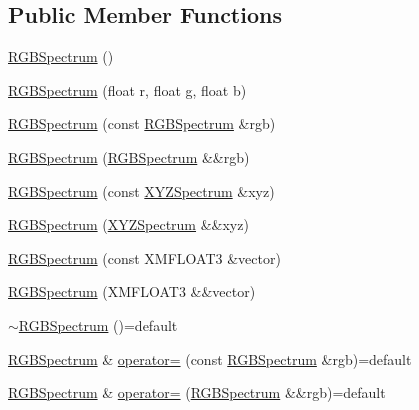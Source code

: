 \subsection*{Public Member Functions}
\begin{DoxyCompactItemize}
\item 
\hyperlink{structmage_1_1_r_g_b_spectrum_ac9ebcf270e9572fd0af180f50b7ceb10}{R\+G\+B\+Spectrum} ()
\item 
\hyperlink{structmage_1_1_r_g_b_spectrum_aae798159a0ea02e95347918ef881b3aa}{R\+G\+B\+Spectrum} (float r, float g, float b)
\item 
\hyperlink{structmage_1_1_r_g_b_spectrum_a5cf405a5fbaa641a421df5767d2847b4}{R\+G\+B\+Spectrum} (const \hyperlink{structmage_1_1_r_g_b_spectrum}{R\+G\+B\+Spectrum} \&rgb)
\item 
\hyperlink{structmage_1_1_r_g_b_spectrum_a866ef0a3fe393f853d969e00a4c02086}{R\+G\+B\+Spectrum} (\hyperlink{structmage_1_1_r_g_b_spectrum}{R\+G\+B\+Spectrum} \&\&rgb)
\item 
\hyperlink{structmage_1_1_r_g_b_spectrum_a7c87ee10a81c55b1954915c1abea0cb9}{R\+G\+B\+Spectrum} (const \hyperlink{structmage_1_1_x_y_z_spectrum}{X\+Y\+Z\+Spectrum} \&xyz)
\item 
\hyperlink{structmage_1_1_r_g_b_spectrum_ad3307598d8156374483f66c0d3492b90}{R\+G\+B\+Spectrum} (\hyperlink{structmage_1_1_x_y_z_spectrum}{X\+Y\+Z\+Spectrum} \&\&xyz)
\item 
\hyperlink{structmage_1_1_r_g_b_spectrum_af2837c778d5aa9b065f5b8b0a039fa02}{R\+G\+B\+Spectrum} (const X\+M\+F\+L\+O\+A\+T3 \&vector)
\item 
\hyperlink{structmage_1_1_r_g_b_spectrum_aa97e6d34ba6bd45c071b458ee7f69191}{R\+G\+B\+Spectrum} (X\+M\+F\+L\+O\+A\+T3 \&\&vector)
\item 
\hyperlink{structmage_1_1_r_g_b_spectrum_a7c18a007349953b1e4711a4856680b02}{$\sim$\+R\+G\+B\+Spectrum} ()=default
\item 
\hyperlink{structmage_1_1_r_g_b_spectrum}{R\+G\+B\+Spectrum} \& \hyperlink{structmage_1_1_r_g_b_spectrum_ac4701cc62489d27130853c3ba667a767}{operator=} (const \hyperlink{structmage_1_1_r_g_b_spectrum}{R\+G\+B\+Spectrum} \&rgb)=default
\item 
\hyperlink{structmage_1_1_r_g_b_spectrum}{R\+G\+B\+Spectrum} \& \hyperlink{structmage_1_1_r_g_b_spectrum_a3a487cd0fcb35395c0979552dc551829}{operator=} (\hyperlink{structmage_1_1_r_g_b_spectrum}{R\+G\+B\+Spectrum} \&\&rgb)=default
\end{DoxyCompactItemize}


